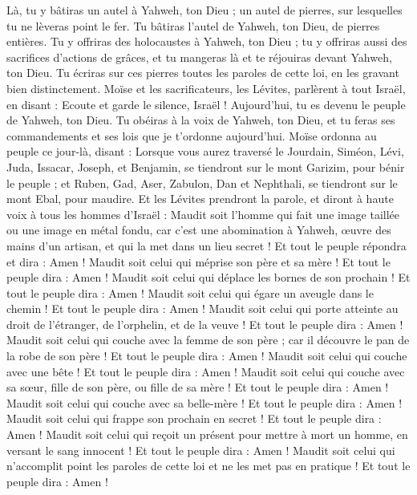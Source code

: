 \begin{multicols}{2}
Là, tu y bâtiras un autel à Yahweh, ton Dieu ; un autel de pierres, sur lesquelles tu ne lèveras point le fer.
Tu bâtiras l'autel de Yahweh, ton Dieu, de pierres entières. Tu y offriras des holocaustes à Yahweh, ton Dieu ;
tu y offriras aussi des sacrifices d’actions de grâces, et tu mangeras là et te réjouiras devant Yahweh, ton Dieu.
Tu écriras sur ces pierres toutes les paroles de cette loi, en les gravant bien distinctement.
Moïse et les sacrificateurs, les Lévites, parlèrent à tout Israël, en disant : Ecoute et garde le silence, Israël ! Aujourd'hui, tu es devenu le peuple de Yahweh, ton Dieu.
Tu obéiras à la voix de Yahweh, ton Dieu, et tu feras ses commandements et ses lois que je t’ordonne aujourd'hui.
Moïse ordonna au peuple ce jour-là, disant :
Lorsque vous aurez traversé le Jourdain, Siméon, Lévi, Juda, Issacar, Joseph, et Benjamin, se tiendront sur le mont Garizim, pour bénir le peuple ;
et Ruben, Gad, Aser, Zabulon, Dan et Nephthali, se tiendront sur le mont Ebal, pour maudire.
Et les Lévites prendront la parole, et diront à haute voix à tous les hommes d'Israël :
Maudit soit l'homme qui fait une image taillée ou une image en métal fondu, car c'est une abomination à Yahweh, œuvre des mains d'un artisan, et qui la met dans un lieu secret ! Et tout le peuple répondra et dira : Amen !
Maudit soit celui qui méprise son père et sa mère ! Et tout le peuple dira : Amen !
Maudit soit celui qui déplace les bornes de son prochain ! Et tout le peuple dira : Amen !
Maudit soit celui qui égare un aveugle dans le chemin ! Et tout le peuple dira : Amen !
Maudit soit celui qui porte atteinte au droit de l'étranger, de l'orphelin, et de la veuve ! Et tout le peuple dira : Amen !
Maudit soit celui qui couche avec la femme de son père ; car il découvre le pan de la robe de son père ! Et tout le peuple dira : Amen !
Maudit soit celui qui couche avec une bête ! Et tout le peuple dira : Amen !
Maudit soit celui qui couche avec sa sœur, fille de son père, ou fille de sa mère ! Et tout le peuple dira : Amen !
Maudit soit celui qui couche avec sa belle-mère ! Et tout le peuple dira : Amen !
Maudit soit celui qui frappe son prochain en secret ! Et tout le peuple dira : Amen !
Maudit soit celui qui reçoit un présent pour mettre à mort un homme, en versant le sang innocent ! Et tout le peuple dira : Amen !
Maudit soit celui qui n’accomplit point les paroles de cette loi et ne les met pas en pratique ! Et tout le peuple dira : Amen !

\end{multicols}
